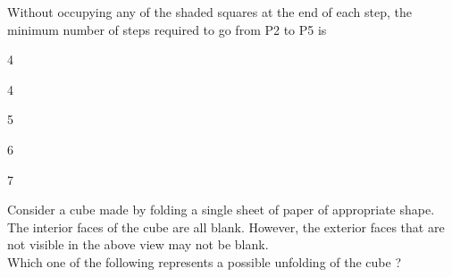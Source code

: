 		Without occupying any of the shaded squares at the end of each step, the minimum number of steps required to go from P2 to P5 is
		\begin{enumerate}
		\end{enumerate}
	\item Consider a cube made by folding a single sheet of paper of appropriate shape. The interior faces of the cube are all blank. However, the exterior faces that are not visible in the above view may not be blank. \\
		Which one of the following represents a possible unfolding of the  cube ?
